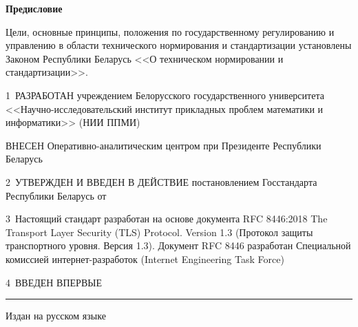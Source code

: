 \rule{0pt}{5mm}

\centerline{\bf Предисловие} 

Цели, основные принципы, положения по государственному регулированию и 
управлению в области технического нормирования и стандартизации 
установлены Законом Республики Беларусь <<О техническом нормировании и 
стандартизации>>.  

\vskip0.2cm

1~РАЗРАБОТАН учреждением Белорусского государственного университета 
<<Науч\-но-исследовательский  институт прикладных проблем математики и 
информатики>> (НИИ ППМИ)

ВНЕСЕН Оперативно-аналитическим центром при Президенте Республики Беларусь 

2~УТВЕРЖДЕН И ВВЕДЕН В ДЕЙСТВИЕ постановлением Госстандарта Республики 
Беларусь от $\phantom{\text{22 мая 2014 г.}}$~\No~$\phantom{23}$

3~Настоящий стандарт разработан на основе документа RFC 8446:2018 The 
Transport Layer Security (TLS) Protocol. Version 1.3 (Протокол защиты 
транспортного уровня. Версия 1.3). Документ RFC 8446 разработан 
Специальной комиссией интернет-разработок (Internet Engineering Task 
Force)

4~ВВЕДЕН ВПЕРВЫЕ

\vfill
\hrule
\vskip1mm
Издан на русском языке

\pagebreak
